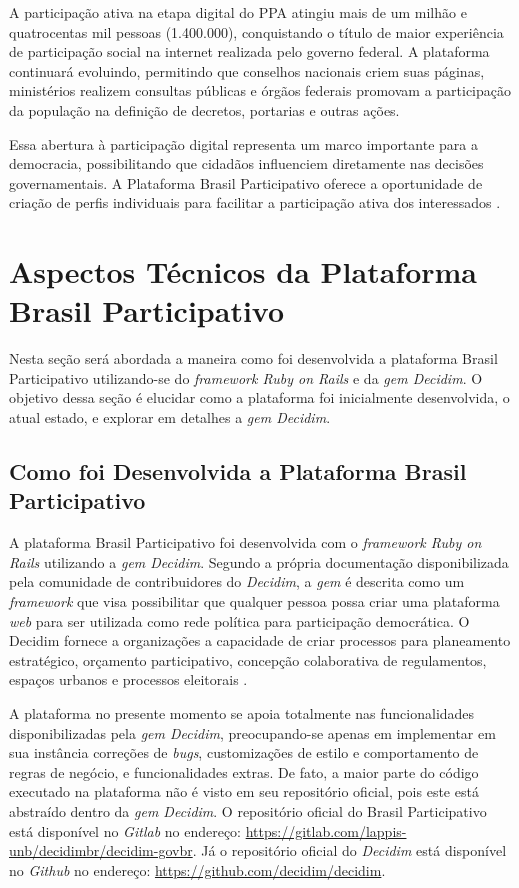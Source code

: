 A participação ativa na etapa digital do PPA atingiu mais de um milhão e quatrocentas mil pessoas (1.400.000), conquistando o título de maior experiência de participação social na internet realizada pelo governo federal. A plataforma continuará evoluindo, permitindo que conselhos nacionais criem suas páginas, ministérios realizem consultas públicas e órgãos federais promovam a participação da população na definição de decretos, portarias e outras ações.

Essa abertura à participação digital representa um marco importante para a democracia, possibilitando que cidadãos influenciem diretamente nas decisões governamentais. A Plataforma Brasil Participativo oferece a oportunidade de criação de perfis individuais para facilitar a participação ativa dos interessados \cite{brasilparticipativo-sobre}.

\section{Aspectos Técnicos da Plataforma Brasil Participativo}
\label{sec:aspectos_tecnicos_da_plataforma_brasil_participativo}

Nesta seção será abordada a maneira como foi desenvolvida a plataforma Brasil Participativo utilizando-se do \textit{framework Ruby on Rails} e da \textit{gem Decidim}. O objetivo dessa seção é elucidar como a plataforma foi inicialmente desenvolvida, o atual estado, e explorar em detalhes a \textit{gem Decidim}.

\subsection{Como foi Desenvolvida a Plataforma Brasil Participativo}

A plataforma Brasil Participativo foi desenvolvida com o \textit{framework Ruby on Rails} utilizando a \textit{gem Decidim}. Segundo a própria documentação disponibilizada pela comunidade de contribuidores do \textit{Decidim}, a \textit{gem} é descrita como um \textit{framework} que visa possibilitar que qualquer pessoa possa criar uma plataforma \textit{web} para ser utilizada como rede política para participação democrática. O Decidim fornece a organizações a capacidade de criar processos para planeamento estratégico, orçamento participativo, concepção colaborativa de regulamentos, espaços urbanos e processos eleitorais \cite{decidim-about}.

A plataforma no presente momento se apoia totalmente nas funcionalidades disponibilizadas pela \textit{gem Decidim}, preocupando-se apenas em implementar em sua instância correções de \textit{bugs}, customizações de estilo e comportamento de regras de negócio, e funcionalidades extras. De fato, a maior parte do código executado na plataforma não é visto em seu repositório oficial, pois este está abstraído dentro da \textit{gem Decidim}. O repositório oficial do Brasil Participativo está disponível no \textit{Gitlab} no endereço: \href{https://gitlab.com/lappis-unb/decidimbr/decidim-govbr}{https://gitlab.com/lappis-unb/decidimbr/decidim-govbr}. Já o repositório oficial do \textit{Decidim} está disponível no \textit{Github} no endereço: \href{https://github.com/decidim/decidim}{https://github.com/decidim/decidim}.


